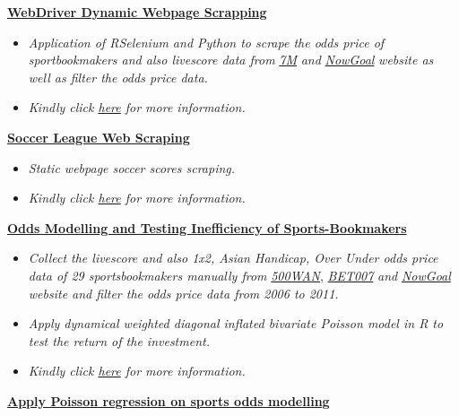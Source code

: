 \documentclass[]{article}
\providecommand{\tightlist}{%
  \setlength{\itemsep}{0pt}\setlength{\parskip}{0pt}}
\begin{document}
\href{https://github.com/Scibrokes/WebDriver-DynamicWebpage-Scrapping}{\textbf{WebDriver
Dynamic Webpage Scrapping}}

\begin{itemize}
\tightlist
\item
  \emph{Application of RSelenium and Python to scrape the odds price of
  sportbookmakers and also livescore data from}
  \href{http://odds.7m.hk/en/}{\emph{7M}} \emph{and}
  \href{http://info.nowgoal.com/en/}{\emph{NowGoal}} \emph{website as
  well as filter the odds price data.}
\item
  \emph{Kindly click
  \href{https://github.com/Scibrokes/WebDriver-DynamicWebpage-Scrapping}{here}
  for more information.}
\end{itemize}

\href{https://github.com/Scibrokes/Soccer-League-Web-Scraping}{\textbf{Soccer
League Web Scraping}}

\begin{itemize}
\tightlist
\item
  \emph{Static webpage soccer scores scraping.}
\item
  \emph{Kindly click
  \href{https://github.com/Scibrokes/Soccer-League-Web-Scraping}{here}
  for more information.}
\end{itemize}

\href{https://github.com/scibrokes/odds-modelling-and-testing-inefficiency-of-sports-bookmakers}{\textbf{Odds
Modelling and Testing Inefficiency of Sports-Bookmakers}}

\begin{itemize}
\tightlist
\item
  \emph{Collect the livescore and also 1x2, Asian Handicap, Over Under
  odds price data of 29 sportsbookmakers manually from}
  \href{http://www.500wan.com}{\emph{500WAN}},
  \href{http://www.bet007.com}{\emph{BET007}} \emph{and}
  \href{http://info.nowgoal.com/en/}{\emph{NowGoal}} \emph{website and
  filter the odds price data from 2006 to 2011.}
\item
  \emph{Apply dynamical weighted diagonal inflated bivariate Poisson
  model in R to test the return of the investment.}
\item
  \emph{Kindly click
  \href{https://github.com/scibrokes/odds-modelling-and-testing-inefficiency-of-sports-bookmakers}{here}
  for more information.}
\end{itemize}

\href{https://www.dropbox.com/sh/h3e6gv59onz311j/AAAFcfFOfon-kEhveTzvHGHza?dl=0}{\textbf{Apply
Poisson regression on sports odds modelling}}
\end{document}
